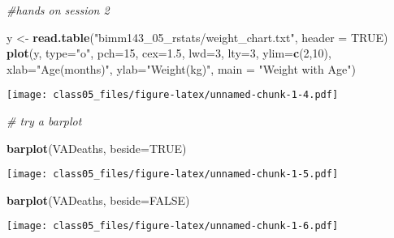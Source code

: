 \documentclass[]{article}
\newenvironment{Shaded}{\begin{snugshade}}{\end{snugshade}}
\newcommand{\KeywordTok}[1]{\textcolor[rgb]{0.13,0.29,0.53}{\textbf{#1}}}
\newcommand{\DataTypeTok}[1]{\textcolor[rgb]{0.13,0.29,0.53}{#1}}
\newcommand{\DecValTok}[1]{\textcolor[rgb]{0.00,0.00,0.81}{#1}}
\newcommand{\FloatTok}[1]{\textcolor[rgb]{0.00,0.00,0.81}{#1}}
\newcommand{\StringTok}[1]{\textcolor[rgb]{0.31,0.60,0.02}{#1}}
\newcommand{\CommentTok}[1]{\textcolor[rgb]{0.56,0.35,0.01}{\textit{#1}}}
\newcommand{\OtherTok}[1]{\textcolor[rgb]{0.56,0.35,0.01}{#1}}
\newcommand{\NormalTok}[1]{#1}
\begin{document}
\begin{Shaded}
\begin{Highlighting}[]
\CommentTok{#hands on session 2}

\NormalTok{y <-}\StringTok{ }\KeywordTok{read.table}\NormalTok{(}\StringTok{"bimm143_05_rstats/weight_chart.txt"}\NormalTok{, }\DataTypeTok{header =} \OtherTok{TRUE}\NormalTok{)}
\KeywordTok{plot}\NormalTok{(y, }\DataTypeTok{type=}\StringTok{"o"}\NormalTok{, }\DataTypeTok{pch=}\DecValTok{15}\NormalTok{, }\DataTypeTok{cex=}\FloatTok{1.5}\NormalTok{, }\DataTypeTok{lwd=}\DecValTok{3}\NormalTok{, }\DataTypeTok{lty=}\DecValTok{3}\NormalTok{, }\DataTypeTok{ylim=}\KeywordTok{c}\NormalTok{(}\DecValTok{2}\NormalTok{,}\DecValTok{10}\NormalTok{), }\DataTypeTok{xlab=}\StringTok{"Age(months)"}\NormalTok{, }\DataTypeTok{ylab=}\StringTok{"Weight(kg)"}\NormalTok{, }\DataTypeTok{main =} \StringTok{"Weight with Age"}\NormalTok{)}
\end{Highlighting}
\end{Shaded}

\texttt{[image: class05\_files/figure-latex/unnamed-chunk-1-4.pdf]}

\begin{Shaded}
\begin{Highlighting}[]
\CommentTok{# try a barplot}

\KeywordTok{barplot}\NormalTok{(VADeaths, }\DataTypeTok{beside=}\OtherTok{TRUE}\NormalTok{)}
\end{Highlighting}
\end{Shaded}

\texttt{[image: class05\_files/figure-latex/unnamed-chunk-1-5.pdf]}

\begin{Shaded}
\begin{Highlighting}[]
\KeywordTok{barplot}\NormalTok{(VADeaths, }\DataTypeTok{beside=}\OtherTok{FALSE}\NormalTok{)}
\end{Highlighting}
\end{Shaded}

\texttt{[image: class05\_files/figure-latex/unnamed-chunk-1-6.pdf]}
\end{document}
